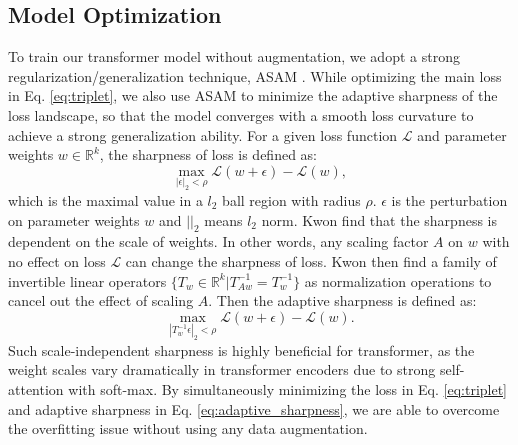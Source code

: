 \documentclass[10pt,twocolumn,letterpaper]{article}
\begin{document}
\subsection{Model Optimization}
\label{sec:asam}
To train our transformer model without augmentation, we adopt a strong regularization/generalization technique, ASAM \cite{ASAM}. While optimizing the main loss in Eq. \ref{eq:triplet}, we also use ASAM to minimize the adaptive sharpness of the loss landscape, so that the model converges with a smooth loss curvature to achieve a strong generalization ability. 
For a given loss function $\mathcal{L}$ and parameter weights $w\in \mathbb{R}^{k}$, the sharpness of loss is defined as:
\begin{equation}
    \operatorname*{max}_{|\epsilon|_{2}<\rho} \mathcal{L}(w+\epsilon)-\mathcal{L}(w),
    \label{eq:sharpness}
\end{equation}
which is the maximal value in a $l_{2}$ ball region with radius  $\rho$. $\epsilon$ is the perturbation on parameter weights $w$ and $| |_{2}$ means $l_{2}$ norm. Kwon \etal \cite{ASAM} find that the sharpness is dependent on the scale of weights. In other words, any scaling factor $A$ on $w$ with no effect on loss $\mathcal{L}$ can change the sharpness of loss. Kwon \etal then find a family of invertible linear operators $\{T_{w} \in \mathbb{R}^{k}|T_{Aw}^{-1}=T_{w}^{-1}\}$ as normalization operations to  cancel out the effect of scaling $A$. Then the adaptive sharpness is defined as:
\begin{equation}
    \operatorname*{max}_{|T_{w}^{-1}\epsilon|_{2}<\rho} \mathcal{L}(w+\epsilon)-\mathcal{L}(w).
    \label{eq:adaptive_sharpness}
\end{equation}
Such scale-independent sharpness is highly beneficial for transformer, as the weight scales vary dramatically in transformer encoders due to strong self-attention with soft-max. By simultaneously minimizing the loss in Eq. \ref{eq:triplet} and adaptive sharpness in Eq. \ref{eq:adaptive_sharpness}, we are able to overcome the overfitting issue without using any data augmentation. 
\end{document}
